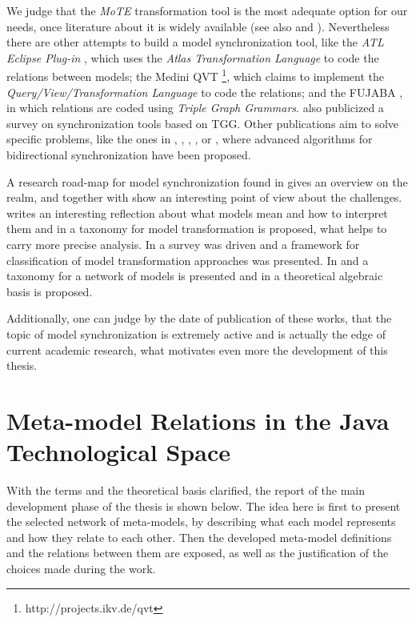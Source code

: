 \documentclass[tuberlin,cic,tc,english,noabntcite]{iiufrgs}
\begin{document}
We judge that the \emph{MoTE} transformation tool is the most adequate option for our needs, once literature about it is widely available (see also \citep{giese2009efficient} and \citep{hildebrandt2012mdelab}). Nevertheless there are other attempts to build a model synchronization tool, like the \emph{ATL Eclipse Plug-in} \citep{jouault2008atl}, which uses the \emph{Atlas Transformation Language} to code the relations between models; the Medini QVT \footnote{http://projects.ikv.de/qvt}, which claims to implement the \emph{Query/View/Transformation Language} to code the relations; and the FUJABA \citep{nickel2000fujaba}, in which relations are coded using \emph{Triple Graph Grammars}. \citet{hildebrandt2013survey} also publicized a survey on synchronization tools based on TGG. Other publications aim to solve specific problems, like the ones in \citet{hermann2011correctness}, \citet{xiong2007towards}, \citet{giese2006incremental}, \citet{ivkovic2004tracing}, or \citet{song2011instant}, where advanced algorithms for bidirectional synchronization have been proposed.

A research road-map for model synchronization found in \citet{france2007model} gives an overview on the realm, and together with \citet{mattsson2009linking} show an interesting point of view about the challenges. \citet{seidewitz2003models} writes an interesting reflection  about what models mean and how to interpret them and in \citet{mens2006taxonomy} a taxonomy for model transformation is proposed, what helps to carry more precise analysis. In \citet{czarnecki2006feature} a survey was driven and a framework for classification of model transformation approaches was presented. In \citeauthor{diskin2014towards} \citeyearpar{diskin2014towards} and \citeyearpar{diskin2016three} a taxonomy for a network of models is presented and in \citet{diskin2011model} a theoretical algebraic basis is proposed.

Additionally, one can judge by the date of publication of these works, that the topic of model synchronization is extremely active and is actually the edge of current academic research, what motivates even more the development of this thesis.

\chapter{Meta-model Relations in the Java Technological Space}
\label{chapter:metamodel_relations}
With the terms and the theoretical basis clarified, the report of the main development phase of the thesis is shown below. The idea here is first to present the selected network of meta-models, by describing what each model represents and how they relate to each other. Then the developed meta-model definitions and the relations between them are exposed, as well as the justification of the choices made during the work.
\end{document}
